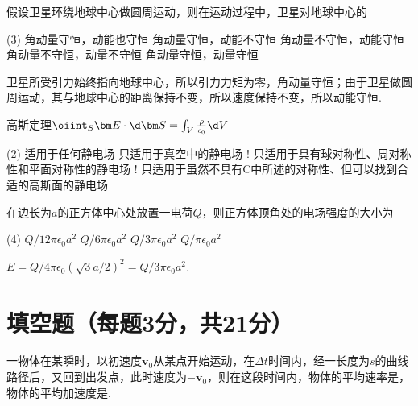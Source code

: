 \begin{problem}
    假设卫星环绕地球中心做圆周运动，则在运动过程中，卫星对地球中心的
    \begin{tasks}(3)
        \task[\true] 角动量守恒，动能也守恒
        \task 角动量守恒，动能不守恒
        \task 角动量不守恒，动能守恒
        \task 角动量不守恒，动量不守恒
        \task 角动量守恒，动量守恒
    \end{tasks}
\end{problem}
\begin{solution}
    卫星所受引力始终指向地球中心，所以引力力矩为零，角动量守恒；由于卫星做圆周运动，其与地球中心的距离保持不变，所以速度保持不变，所以动能守恒.
\end{solution}

\begin{problem}
    高斯定理$\oiint_S{\bm E\cdot\d\bm S}=\int_V{\frac{\rho}{\epsilon_0}\d V}$
    \begin{tasks}(2)
        \task[\true] 适用于任何静电场
        \task 只适用于真空中的静电场
        \task! 只适用于具有球对称性、周对称性和平面对称性的静电场
        \task! 只适用于虽然不具有C中所述的对称性、但可以找到合适的高斯面的静电场
    \end{tasks}
\end{problem}

\begin{problem}
    在边长为$a$的正方体中心处放置一电荷$Q$，则正方体顶角处的电场强度的大小为
    \begin{tasks}(4)
        \task $Q/12\pi\epsilon_0a^2$
        \task $Q/6\pi\epsilon_0a^2$
        \task[\true] $Q/3\pi\epsilon_0a^2$
        \task $Q/\pi\epsilon_0a^2$
    \end{tasks}
\end{problem}
\begin{solution}
    $E=Q/4\pi\epsilon_0(\sqrt{3}a/2)^2=Q/3\pi\epsilon_0a^2$.
\end{solution}

\section{填空题（每题3分，共21分）}

\begin{problem}
    一物体在某瞬时，以初速度$\bm v_0$从某点开始运动，在$\Delta t$时间内，经一长度为$s$的曲线路径后，又回到出发点，此时速度为$-\bm v_0$，则在这段时间内，物体的平均速率是，物体的平均加速度是.
\end{problem}

